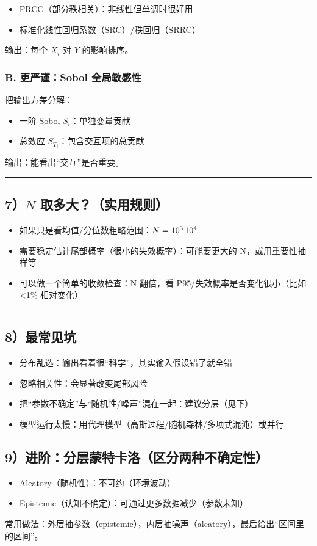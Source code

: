 \begin{itemize}
  \item PRCC（部分秩相关）：非线性但单调时很好用
  \item 标准化线性回归系数（SRC）/秩回归（SRRC）
\end{itemize}

输出：每个 \(X_i\) 对 \(Y\) 的影响排序。

\subsubsection{B. 更严谨：Sobol 全局敏感性}

把输出方差分解：

\begin{itemize}
  \item 一阶 Sobol \(S_i\)：单独变量贡献
  \item 总效应 \(S_{T_i}\)：包含交互项的总贡献
\end{itemize}

输出：能看出“交互”是否重要。

\hrule

\subsection{7）\(N\) 取多大？（实用规则）}

\begin{itemize}
  \item 如果只是看均值/分位数粗略范围：\(N=10^3 \thinspace 10^4\)
  \item 需要稳定估计尾部概率（很小的失效概率）：可能要更大的 N，或用重要性抽样等
  \item 可以做一个简单的收敛检查：N 翻倍，看 P95/失效概率是否变化很小（比如 <1\% 相对变化）
\end{itemize}

\hrule

\subsection{8）最常见坑}

\begin{itemize}
  \item 分布乱选：输出看着很“科学”，其实输入假设错了就全错
  \item 忽略相关性：会显著改变尾部风险
  \item 把“参数不确定”与“随机性/噪声”混在一起：建议分层（见下）
  \item 模型运行太慢：用代理模型（高斯过程/随机森林/多项式混沌）或并行
\end{itemize}

\subsection{9）进阶：分层蒙特卡洛（区分两种不确定性）}

\begin{itemize}
  \item Aleatory（随机性）：不可约（环境波动）
  \item Epistemic（认知不确定）：可通过更多数据减少（参数未知）
\end{itemize}

常用做法：外层抽参数（epistemic），内层抽噪声（aleatory），最后给出“区间里的区间”。
